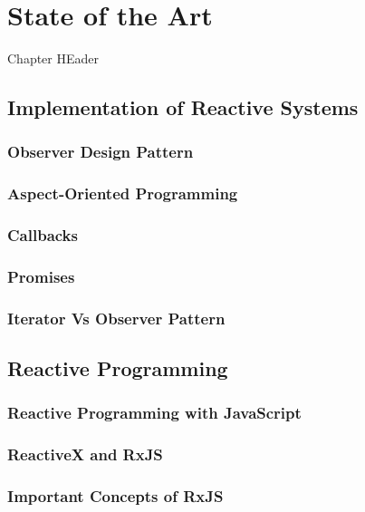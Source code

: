 \chapter{State of the Art} \label{chap:State of the Art}
Chapter HEader

\section{Implementation of Reactive Systems}

\subsection{Observer Design Pattern}


\subsection{Aspect-Oriented Programming} \label{subsec:AOP}

\subsection{Callbacks}

\subsection{Promises}

\subsection{Iterator Vs Observer Pattern}


\section{Reactive Programming}

\subsection{Reactive Programming with JavaScript}


\subsection{ReactiveX and RxJS}

\subsection{Important Concepts of RxJS}

